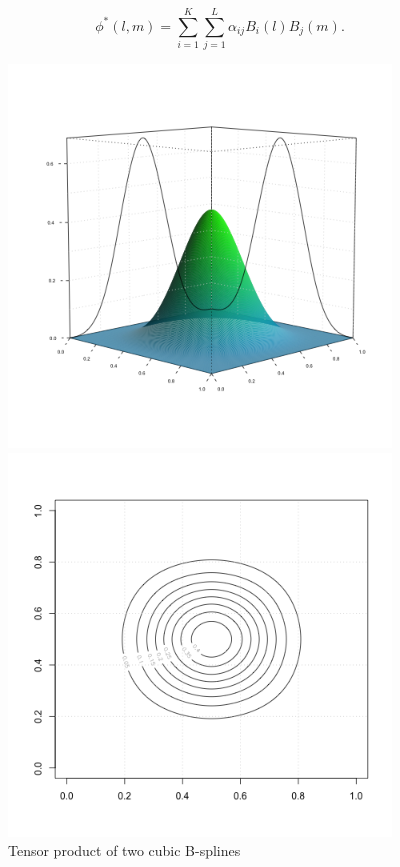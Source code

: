 \documentclass[12pt]{article}
\theoremstyle{definition}
\begin{document}
\begin{equation} \label{eq:varying-coefficient-tensor-product-expansion}
\phi^*\left(l,m\right) = \sum_{i=1}^K \sum_{j=1}^L \alpha_{ij} B_{i}\left(l\right) B_{j}\left(m\right).
\end{equation}


\begin{figure}[H]
\centering
 \graphicspath{{img/}}
  \includegraphics[width=4in, height=4in]{bicubic_basis_function.png}
 
\includegraphics[width=4in, height=4in]{bicubic_bspline_contour.png}
\caption{Tensor product of two cubic B-splines}
\label{fig:bicubic_BS}
\end{figure}
\end{document}
